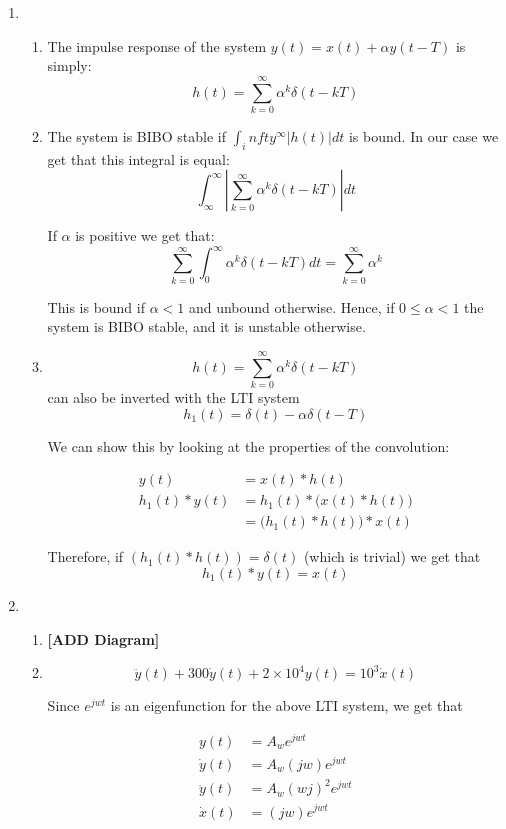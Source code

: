 \documentclass[]{article}
\date{}
\begin{document}
\begin{enumerate}
\def\labelenumi{\arabic{enumi})}
\item
  \begin{enumerate}
  \def\labelenumii{\alph{enumii}.}
  \item
    The impulse response of the system \(y(t) = x(t) + \alpha y(t - T)\)
    is simply: \[
        h(t) = \sum_{k = 0}^\infty \alpha^k \delta(t - kT)
    \]
  \item
    The system is BIBO stable if \(\int_infty^\infty |h(t)|dt\) is
    bound. In our case we get that this integral is equal: \[
        \int_\infty^\infty \left| 
            \sum_{k = 0}^\infty \alpha^k \delta(t - kT)
        \right| dt
    \]

    If \(\alpha\) is positive we get that: \[
        \sum_{k = 0}^\infty \int_0^\infty \alpha^k \delta(t - kT)dt  = 
            \sum_{k = 0}^\infty \alpha^k
    \]

    This is bound if \(\alpha < 1\) and unbound otherwise. Hence, if
    \(0 \leq \alpha < 1\) the system is BIBO stable, and it is unstable
    otherwise.
  \item
    \[
        h(t) = \sum_{k = 0}^\infty \alpha^k \delta(t - kT)
    \] can also be inverted with the LTI system \[
        \boxed{h_1(t) = \delta(t) - \alpha \delta(t - T)}
    \]

    We can show this by looking at the properties of the convolution:

    \begin{align*}
        y(t) &= x(t) * h(t) \\
        h_1(t) * y(t) &= h_1(t) * \Big( x(t) * h(t) \Big) \\
        &= \Big( h_1(t) * h(t) \Big) * x(t)
    \end{align*}

    Therefore, if \((h_1(t) * h(t)) = \delta(t)\) (which is trivial) we
    get that \[
        h_1(t) * y(t)  = x(t)
    \]
  \end{enumerate}
\item
  \begin{enumerate}
  \def\labelenumii{\alph{enumii}.}
  \item
    \textbf{{[}ADD Diagram{]}}
  \item
    \[
        \ddot{y}(t) + 300\dot{y}(t) + 2 \times 10^4 y(t) = 10^3 \dot{x}(t)
    \]

    Since \(e^{jwt}\) is an eigenfunction for the above LTI system, we
    get that

    \begin{align*}
        y(t) &= A_w e^{jwt} \\
        \dot{y}(t) &= A_w (jw) e^{jwt} \\
        \ddot{y}(t) &= A_w (wj)^2 e^{jwt} \\
        \dot{x}(t) &= (jw) e^{jwt}
    \end{align*}


\end{enumerate}
\end{enumerate}
\end{document}
